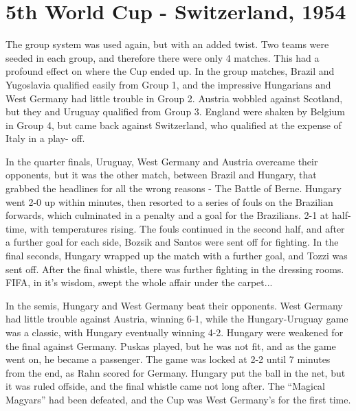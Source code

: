 \section{5th World Cup - Switzerland, 1954}
The group system was used again, but with an added twist. Two teams were seeded
in each group, and therefore there were only 4 matches. This had a profound 
effect on where the Cup ended up. In the group matches, Brazil and Yugoslavia 
qualified easily from Group 1, and the impressive Hungarians and West Germany 
had little trouble in Group 2. Austria wobbled against Scotland, but they and 
Uruguay qualified from Group 3. England were shaken by Belgium in Group 4, but 
came back against Switzerland, who qualified at the expense of Italy in a play-
off.

In the quarter finals, Uruguay, West Germany and Austria overcame their 
opponents, but it was the other match, between Brazil and Hungary, that grabbed
the headlines for all the wrong reasons - The Battle of Berne. Hungary went 2-0
up within minutes, then resorted to a series of fouls on the Brazilian 
forwards, which culminated in a penalty and a goal for the Brazilians. 2-1 at 
half-time, with temperatures rising. The fouls continued in the second half, 
and after a further goal for each side, Bozsik and Santos were sent off for 
fighting. In the final seconds, Hungary wrapped up the match with a further 
goal, and Tozzi was sent off. After the final whistle, there was further 
fighting in the dressing rooms. FIFA, in it's wisdom, swept the whole affair 
under the carpet...

In the semis, Hungary and West Germany beat their opponents. West Germany had 
little trouble against Austria, winning 6-1, while the Hungary-Uruguay game was
a classic, with Hungary eventually winning 4-2. Hungary were weakened for the 
final against Germany. Puskas played, but he was not fit, and as the game went
on, he became a passenger. The game was locked at 2-2 until 7 minutes from the
end, as Rahn scored for Germany. Hungary put the ball in the net, but it was 
ruled offside, and the final whistle came not long after. The ``Magical Magyars''
had been defeated, and the Cup was West Germany's for the first time.
